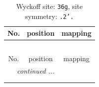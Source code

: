 \documentclass[fleqn,8pt]{jsarticle}
\begin{document}
\renewcommand{\arraystretch}{1.2}
\begin{longtable}{ccc}
\caption{Wyckoff site: {\tt 36g}, site symmetry: {\tt .2'.}}
 \\
 \hline \hline
No. & position & mapping \\ \hline \endfirsthead

\multicolumn{2}{l}{\tablename\ \thetable{}} \\
 \hline \hline
No. & position & mapping \\ \hline \endhead

 \hline \hline
\multicolumn{2}{r}{\footnotesize\it continued ...} \\ \endfoot

 \hline \hline
\multicolumn{2}{r}{} \\ \endlastfoot


\end{longtable}
\end{document}
